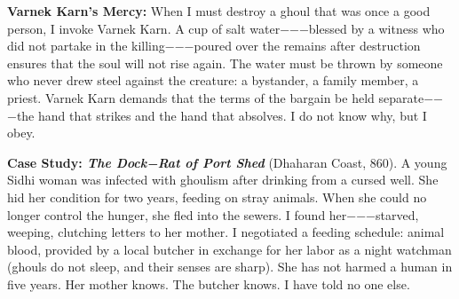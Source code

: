 \textbf{Varnek Karn's Mercy:} When I must destroy a ghoul that was once a good person, I invoke Varnek Karn. A cup of salt water−−−blessed by a witness who did not partake in the killing−−−poured over the remains after destruction ensures that the soul will not rise again. The water must be thrown by someone who never drew steel against the creature: a bystander, a family member, a priest. Varnek Karn demands that the terms of the bargain be held separate−−−the hand that strikes and the hand that absolves. I do not know why, but I obey.

\textbf{Case Study: \emph{The Dock−Rat of Port Shed}} (Dhaharan Coast, 860). A young Sidhi woman was infected with ghoulism after drinking from a cursed well. She hid her condition for two years, feeding on stray animals. When she could no longer control the hunger, she fled into the sewers. I found her−−−starved, weeping, clutching letters to her mother. I negotiated a feeding schedule: animal blood, provided by a local butcher in exchange for her labor as a night watchman (ghouls do not sleep, and their senses are sharp). She has not harmed a human in five years. Her mother knows. The butcher knows. I have told no one else.

